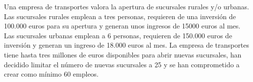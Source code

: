 \documentclass[addpoints,spanish, 12pt,a4paper]{exam}
\begin{document}
\begin{questions}







\question[3] Una empresa de transportes valora la apertura de sucursales rurales y/o urbanas. Las
sucursales rurales emplean a tres personas, requieren de una inversión de 100.000 euros para su apertura y
generan unos ingresos de 15000 euros al mes. Las sucursales urbanas emplean a 6 personas, requieren de
150.000 euros de inversión y generan un ingreso de 18.000 euros al mes. La empresa de transportes tiene
hasta tres millones de euros disponibles para abrir nuevas sucursales, han decidido limitar el número de
nuevas sucursales a 25 y se han comprometido a crear como mínimo 60 empleos.
\end{questions}
\end{document}
